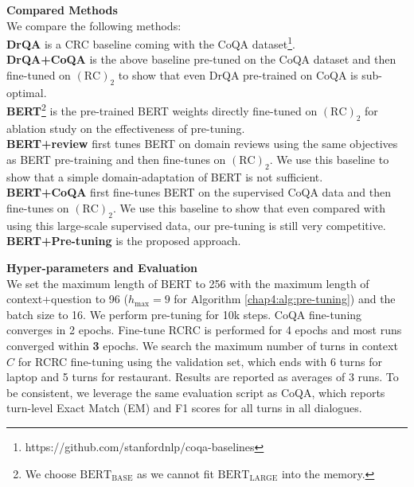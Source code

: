 \textbf{Compared Methods}\\
We compare the following methods: \\
\textbf{DrQA} is a CRC baseline coming with the CoQA dataset\footnote{https://github.com/stanfordnlp/coqa-baselines}. \\
\textbf{DrQA+CoQA} is the above baseline pre-tuned on the CoQA dataset and then fine-tuned on $(\text{RC})_2$ to show that even DrQA pre-trained on CoQA is sub-optimal.\\
\textbf{BERT}\footnote{We choose $\text{BERT}_{\text{BASE}}$ as we cannot fit $\text{BERT}_{\text{LARGE}}$ into the memory.} is the pre-trained BERT weights directly fine-tuned on $(\text{RC})_2$ for ablation study on the effectiveness of pre-tuning.\\
\textbf{BERT+review} first tunes BERT on domain reviews using the same objectives as BERT pre-training and then fine-tunes on $(\text{RC})_2$. We use this baseline to show that a simple domain-adaptation of BERT is not sufficient.\\
\textbf{BERT+CoQA} first fine-tunes BERT on the supervised CoQA data and then fine-tunes on $(\text{RC})_2$. We use this baseline to show that even compared with using this large-scale supervised data, our pre-tuning is still very competitive.\\
\textbf{BERT+Pre-tuning} is the proposed approach.

\textbf{Hyper-parameters and Evaluation}\\
We set the maximum length of BERT to 256 with the maximum length of context+question to 96 ($h_\text{max}=9$ for Algorithm \ref{chap4:alg:pre-tuning}) and the batch size to 16.
We perform pre-tuning for 10k steps. 
CoQA fine-tuning converges in 2 epochs.
Fine-tune RCRC is performed for 4 epochs and most runs converged within \textbf{3} epochs.
We search the maximum number of turns in context $C$ for RCRC fine-tuning using the validation set, which ends with 6 turns for laptop and 5 turns for restaurant.
Results are reported as averages of 3 runs.
To be consistent, we leverage the same evaluation script as CoQA, which reports 
turn-level Exact Match (EM) and F1 scores for all turns in all dialogues.

